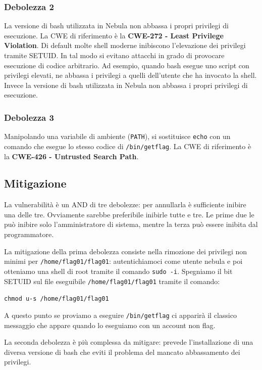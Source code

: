 \subsubsection{Debolezza 2}
La versione di bash utilizzata in Nebula non abbassa i propri privilegi di esecuzione. La CWE di riferimento è la \textbf{CWE-272 - Least Privilege Violation}. Di default molte shell moderne inibiscono l'elevazione dei privilegi tramite SETUID. In tal modo si evitano attacchi in grado di provocare esecuzione di codice arbitrario. Ad esempio, quando bash esegue uno script con privilegi elevati, ne abbassa i privilegi a quelli dell'utente che ha invocato la shell. Invece la versione di bash utilizzata in Nebula non abbassa i propri privilegi di esecuzione.

\subsubsection{Debolezza 3}
Manipolando una variabile di ambiente (\texttt{PATH}), si sostituisce \texttt{echo} con un comando che esegue lo stesso codice di \texttt{/bin/getflag}. La CWE di riferimento è la \textbf{CWE-426 - Untrusted Search Path}.

\subsection{Mitigazione}
La vulnerabilità è un AND di tre debolezze: per annullarla è sufficiente inibire una delle tre. Ovviamente sarebbe preferibile inibirle tutte e tre. Le prime due le può inibire solo l'amministratore di sistema, mentre la terza può essere inibita dal programmatore.

La mitigazione della prima debolezza consiste nella rimozione dei privilegi non minimi per \texttt{/home/flag01/flag01}: autentichiamoci come utente nebula e poi otteniamo una shell di root tramite il comando \texttt{sudo -i}. Spegniamo il bit SETUID sul file eseguibile \texttt{/home/flag01/flag01} tramite il comando:
\begin{center}
    \texttt{chmod u-s /home/flag01/flag01}
\end{center}
A questo punto se proviamo a eseguire \texttt{/bin/getflag} ci apparirà il classico messaggio che appare quando lo eseguiamo con un account non flag.

La seconda debolezza è più complessa da mitigare: prevede l'installazione di una diversa versione di bash che eviti il problema del mancato abbassamento dei privilegi.

